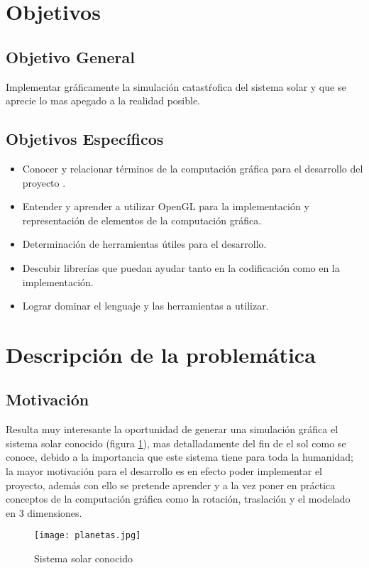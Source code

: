 \documentclass[12pt,journal,compsoc]{IEEEtran}
\begin{document}
\section{Objetivos}
\subsection{Objetivo General}
Implementar gráficamente la simulación catastŕofica del sistema solar y que se aprecie lo mas apegado a la realidad posible.\\
\subsection{Objetivos Específicos}
\begin{itemize}
\item Conocer y relacionar términos de la computación gráfica para el desarrollo del proyecto \cite{foley}.
\item Entender y aprender a utilizar OpenGL para la implementación y representación de elementos de la computación gráfica.
\item Determinación de herramientas útiles para el desarrollo.
\item Descubir librerías que puedan ayudar tanto en la codificación como en la implementación.
\item Lograr dominar el lenguaje y las herramientas a utilizar.
\end{itemize}

\section{Descripción de la problemática}
\subsection{Motivación}
Resulta muy interesante la oportunidad de generar una simulación gráfica el sistema solar \cite{astronomia} conocido (figura \ref{planetas}), mas detalladamente del fin de el sol como se conoce, debido a la importancia que este sistema tiene para toda la humanidad; la mayor motivación para el desarrollo es en efecto poder implementar el proyecto, además con ello se pretende aprender y a la vez poner en práctica conceptos de la computación gráfica como la rotación, traslación y el modelado en 3 dimensiones.\\
\begin{figure}[h!]
  \texttt{[image: planetas.jpg]}
  \caption{Sistema solar conocido}
  \captionsetup{justification=centering}
  \label{planetas}
\end{figure}
\end{document}
